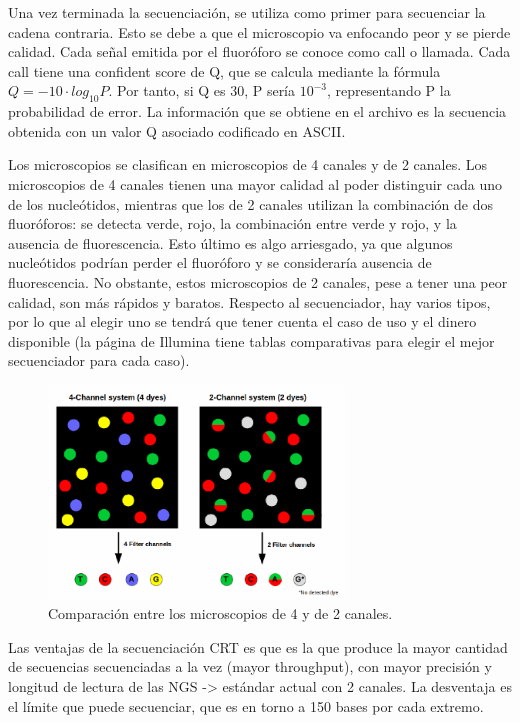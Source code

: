 \begin{itemize}
\begin{itemize}
Una vez terminada la secuenciación, se utiliza como primer para secuenciar la cadena contraria. Esto se debe a que el microscopio va enfocando peor y se pierde calidad. Cada señal emitida por el fluoróforo se conoce como call o llamada. Cada call tiene una confident score de Q, que se calcula mediante la fórmula $Q = - 10 \cdot log_{10} P $. Por tanto, si Q es 30, P sería $10^{-3}$, representando P la probabilidad de error. La información que se obtiene en el archivo es la secuencia obtenida con un valor Q asociado codificado en ASCII. 

Los microscopios se clasifican en microscopios de 4 canales y de 2 canales. Los microscopios de 4 canales tienen una mayor calidad al poder distinguir cada uno de los nucleótidos, mientras que los de 2 canales utilizan la combinación de dos fluoróforos: se detecta verde, rojo, la combinación entre verde y rojo, y la ausencia de fluorescencia. Esto último es algo arriesgado, ya que algunos nucleótidos podrían perder el fluoróforo y se consideraría ausencia de fluorescencia. No obstante, estos microscopios de 2 canales, pese a tener una peor calidad, son más rápidos y baratos. Respecto al secuenciador, hay varios tipos, por lo que al elegir uno se tendrá que tener cuenta el caso de uso y el dinero disponible (la página de Illumina tiene tablas comparativas para elegir el mejor secuenciador para cada caso). 

\begin{figure}[htbp]
\centering
\includegraphics[width = 0.7\textwidth]{figs/microscope-channels.png}
\caption{Comparación entre los microscopios de 4 y de 2 canales.}
\end{figure}

Las ventajas de la secuenciación CRT es que es la que produce la mayor cantidad de secuencias secuenciadas a la vez (mayor throughput), con mayor precisión y longitud de lectura de las NGS -> estándar actual con 2 canales. La desventaja es el límite que puede secuenciar, que es en torno a 150 bases por cada extremo. 


\end{itemize}
\end{itemize}
